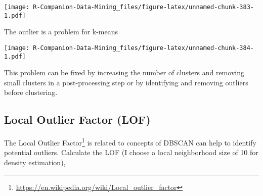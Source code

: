 \documentclass[
  notitlepage]{book}
\newenvironment{Shaded}{\begin{snugshade}}{\end{snugshade}}
\newcommand{\DataTypeTok}[1]{\textcolor[rgb]{0.13,0.29,0.53}{#1}}
\newcommand{\DecValTok}[1]{\textcolor[rgb]{0.00,0.00,0.81}{#1}}
\newcommand{\ErrorTok}[1]{\textcolor[rgb]{0.64,0.00,0.00}{\textbf{#1}}}
\newcommand{\KeywordTok}[1]{\textcolor[rgb]{0.13,0.29,0.53}{\textbf{#1}}}
\newcommand{\NormalTok}[1]{#1}
\newcommand{\OperatorTok}[1]{\textcolor[rgb]{0.81,0.36,0.00}{\textbf{#1}}}
\newcommand{\StringTok}[1]{\textcolor[rgb]{0.31,0.60,0.02}{#1}}
\DeclareRobustCommand{\href}[2]{#2\footnote{\url{#1}}}
\begin{document}
\texttt{[image: R-Companion-Data-Mining\_files/figure-latex/unnamed-chunk-383-1.pdf]}

The outlier is a problem for k-means

\begin{Shaded}
\end{Shaded}

\texttt{[image: R-Companion-Data-Mining\_files/figure-latex/unnamed-chunk-384-1.pdf]}

This problem can be fixed by increasing the number of clusters and
removing small clusters in a post-processing step or by identifying and
removing outliers before clustering.

\hypertarget{local-outlier-factor-lof}{%
\subsection{Local Outlier Factor (LOF)}\label{local-outlier-factor-lof}}

The \href{https://en.wikipedia.org/wiki/Local_outlier_factor}{Local Outlier
Factor} is related
to concepts of DBSCAN can help to identify potential outliers. Calculate
the LOF (I choose a local neighborhood size of 10 for density estimation),
\end{document}
